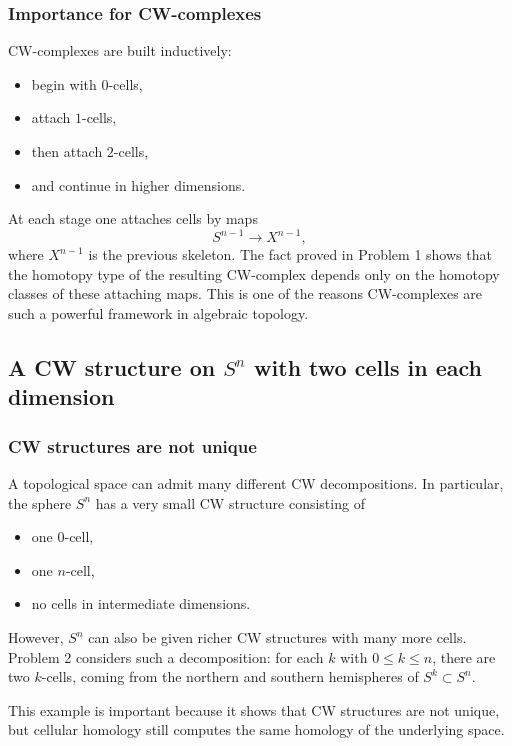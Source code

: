 \documentclass[12pt,a4paper]{article}
\theoremstyle{notespace}
\begin{document}
\subsubsection{Importance for CW-complexes}

CW-complexes are built inductively:
\begin{itemize}
	\item begin with \(0\)-cells,
	\item attach \(1\)-cells,
	\item then attach \(2\)-cells,
	\item and continue in higher dimensions.
\end{itemize}

At each stage one attaches cells by maps
\[
S^{n-1}\to X^{n-1},
\]
where \(X^{n-1}\) is the previous skeleton. The fact proved in Problem 1 shows that the homotopy type of the resulting CW-complex depends only on the homotopy classes of these attaching maps. This is one of the reasons CW-complexes are such a powerful framework in algebraic topology.

\subsection{A CW structure on \(S^n\) with two cells in each dimension}

\subsubsection{CW structures are not unique}

A topological space can admit many different CW decompositions. In particular, the sphere \(S^n\) has a very small CW structure consisting of
\begin{itemize}
	\item one \(0\)-cell,
	\item one \(n\)-cell,
	\item no cells in intermediate dimensions.
\end{itemize}

However, \(S^n\) can also be given richer CW structures with many more cells. Problem 2 considers such a decomposition: for each \(k\) with \(0\le k\le n\), there are two \(k\)-cells, coming from the northern and southern hemispheres of \(S^k\subset S^n\).

This example is important because it shows that CW structures are not unique, but cellular homology still computes the same homology of the underlying space.
\end{document}
